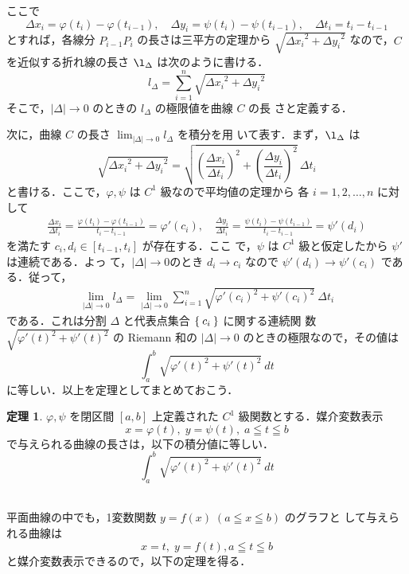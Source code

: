 \documentclass[10pt, uplatex, dvipdfmx]{jsarticle}
\theoremstyle{definition}
\newtheorem{theorem}{定理}[section]
\numberwithin{equation}{section}
\newcommand{\ds}{\displaystyle}
\begin{document}
ここで
\[
\Delta x_i=\varphi(t_i)-\varphi(t_{i-1}), \quad \Delta y_i =\psi(t_i) - \psi(t_{i-1}), \quad
\Delta t_i = t_{i}-t_{i-1}
\]
とすれば，各線分 $P_{i-1}P_i$ の長さは三平方の定理から $\sqrt{{\Delta x_i}^2 + {\Delta
    y_i}^2}$ なので，$C$ を近似する折れ線の長さ $\l_{\Delta}$ は次のように書ける．
\[
  l_{\Delta} = \sum_{i=1}^{n}\sqrt{{\Delta x_i}^2 + {\Delta y_i}^2} 
\]
そこで，$|\Delta| \to 0$ のときの $l_{\Delta}$ の極限値を曲線 $C$ の長
さと定義する．

次に，曲線 $C$ の長さ $\ds \lim_{|\Delta| \to 0} l_{\Delta}$ を積分を用
いて表す．まず，$\l_{\Delta}$ は
\[
  \sqrt{{\Delta x_i}^2 + {\Delta y_i}^2} 
  =\sqrt{ \left(\frac{\Delta x_i}{\Delta
        t_i}\right)^2 + \left( \frac{\Delta y_i}{\Delta t_i}\right)^2
  }\ \Delta t_i
\]
と書ける．ここで，$\varphi, \psi$ は $C^1$ 級なので平均値の定理から
各 $i=1,2,\ldots, n$ に対して
\begin{align*}
  \frac{\Delta x_i}{\Delta t_i} = \frac{\varphi(t_i) - \varphi(t_{i-1})}{t_{i}-t_{i-1}} = \varphi'(c_i), \quad
  \frac{\Delta y_i}{\Delta t_i} = \frac{\psi(t_i) - \psi(t_{i-1})}{t_{i}-t_{i-1}} = \psi'(d_i)
\end{align*}
を満たす $c_i, d_i \in [t_{i-1}, t_{i}]$ が存在する．ここ
で，$\psi$ は $C^1$ 級と仮定したから $\psi'$ は連続である．よっ
て，$|\Delta| \to 0$のとき $d_i \to c_i$ なので $\psi'(d_i) \to
\psi'(c_i)$ である．従って，
\begin{align*}
  \lim_{|\Delta| \to 0} l_{\Delta} 
  = \lim_{|\Delta| \to 0} \sum_{i=1}^{n} \sqrt{ {\varphi'(c_i)}^2 + {\psi'(c_i)}^2}\ \Delta t_i
\end{align*}
である．これは分割 $\Delta$ と代表点集合 $\Set{c_i}$ に関する連続関
数 $\ds \sqrt{ {\varphi'(t)}^2 +
  {\psi'(t)}^2}$ の Riemann 和の $|\Delta| \to 0$ のときの極限なので，その値は
\[
  \int_{a}^{b} \sqrt{{\varphi'(t)}^2 + {\psi'(t)}^2} \ dt
\]
に等しい．以上を定理としてまとめておこう．

\begin{theorem}\label{thm:lencurve}
  $\varphi, \psi$ を閉区間 $[a,b]$ 上定義された $C^1$ 級関数とする．媒介変数表示
  \[
     x=\varphi(t), \; y=\psi(t), \; a \leqq t \leqq b
  \]
  で与えられる曲線の長さは，以下の積分値に等しい．
  \[
    \int_{a}^{b} \sqrt{ {\varphi'(t)}^2 + {\psi'(t)}^2} \ dt
  \]
\end{theorem}

\ \\

平面曲線の中でも，1変数関数 $y=f(x) \; (a \leqq x \leqq b)$ のグラフと
して与えられる曲線は
\[
  x = t, \; y= f(t), a \leqq t \leqq b
\]
と媒介変数表示できるので，以下の定理を得る．
  
\end{document}

